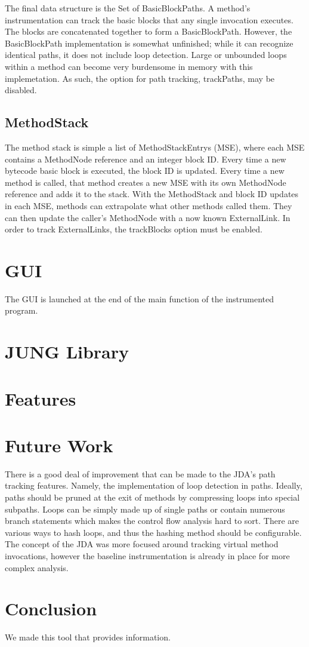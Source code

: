 \documentclass[conference,10pt,twocolumn]{./IEEE/IEEEtran}
\begin{document}
The final data structure is the Set of BasicBlockPaths.
A method’s instrumentation can track the basic blocks that any single invocation executes.
The blocks are concatenated together to form a BasicBlockPath.
However, the BasicBlockPath implementation is somewhat unfinished; while it can recognize identical paths, it does not include loop detection.
Large or unbounded loops within a method can become very burdensome in memory with this implemetation.
As such, the option for path tracking, trackPaths, may be disabled.

\subsection{MethodStack}
The method stack is simple a list of MethodStackEntrys (MSE), where each MSE contains a MethodNode reference and an integer block ID.  
Every time a new bytecode basic block is executed, the block ID is updated.  
Every time a new method is called, that method creates a new MSE with its own MethodNode reference and adds it to the stack.  
With the MethodStack and block ID updates in each MSE, methods can extrapolate what other methods called them.  
They can then update the caller’s MethodNode with a now known ExternalLink.  
In order to track ExternalLinks, the trackBlocks option must be enabled.

\section{GUI}
The GUI is launched at the end of the main function of the instrumented program.
\section{JUNG Library}
\section{Features}

\section{Future Work}
There is a good deal of improvement that can be made to the JDA’s path tracking features.
Namely, the implementation of loop detection in paths.  
Ideally, paths should be pruned at the exit of methods by compressing loops into special subpaths.  
Loops can be simply made up of single paths or contain numerous branch statements which makes the control flow analysis hard to sort.  
There are various ways to hash loops, and thus the hashing method should be configurable.  
The concept of the JDA was more focused around tracking virtual method invocations, however the baseline instrumentation is already in place for more complex analysis.

\section{Conclusion}
We made this tool that provides information.



\end{document}
